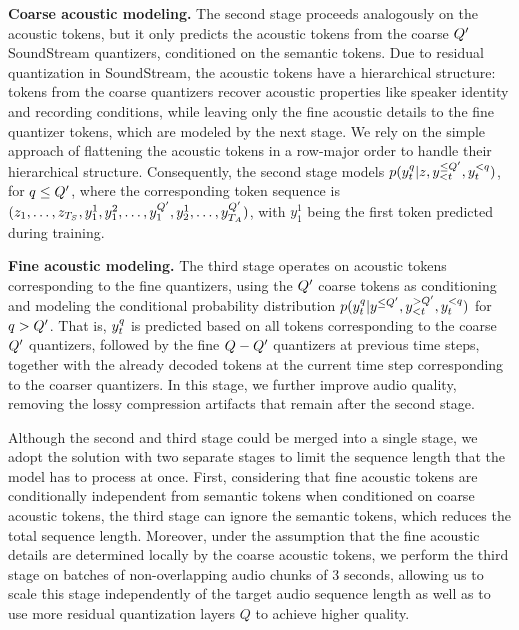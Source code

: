 \documentclass[letterpaper,10 pt]{IEEEtran}
\begin{document}
\noindent
\textbf{Coarse acoustic modeling.} The second stage proceeds analogously on the acoustic tokens, but it only predicts the acoustic tokens from the coarse $Q'$ SoundStream quantizers, conditioned on the semantic tokens. Due to residual quantization in SoundStream, the acoustic tokens have a hierarchical structure: tokens from the coarse quantizers recover acoustic properties like speaker identity and recording conditions, while leaving only the fine acoustic details to the fine quantizer tokens, which are modeled by the next stage. We rely on the simple approach of flattening the acoustic tokens in a row-major order to handle their hierarchical structure. Consequently, the second stage models $p(y_t^q | z, y_{<t}^{\leq Q'}, y_{t}^{< q})$, for $q \leq Q'$, where the corresponding token sequence is $(z_1, \dots, z_{T_S}, y_1^1,y_1^2,\dots,y_1^{Q'}, y_2^1,\dots,y_{T_A}^{Q'})$, with $y_1^1$ being the first token predicted during training.

\noindent
\textbf{Fine acoustic modeling.} The third stage operates on acoustic tokens corresponding to the fine quantizers, using the $Q'$ coarse tokens as conditioning and modeling the conditional probability distribution  $p(y_t^q | y^{\leq Q'}, y_{<t}^{> Q'}, y_{t}^{<q})$ for $q > Q'$. That is, $y_t^q$ is predicted based on all tokens corresponding to the coarse $Q'$ quantizers, followed by the fine $Q-Q'$ quantizers at previous time steps, together with the already decoded tokens at the current time step corresponding to the coarser quantizers. In this stage, we further improve audio quality, removing the lossy compression artifacts that remain after the second stage. 

Although the second and third stage could be merged into a single stage, we adopt the solution with two separate stages to limit the sequence length that the model has to process at once. First, considering that fine acoustic tokens are conditionally independent from semantic tokens when conditioned on coarse acoustic tokens, the third stage can ignore the semantic tokens, which reduces the total sequence length. Moreover, under the assumption that the fine acoustic details are determined locally by the coarse acoustic tokens, we perform the third stage on batches of non-overlapping audio chunks of 3 seconds, allowing us to scale this stage independently of the target audio sequence length as well as to use more residual quantization layers $Q$ to achieve higher quality.
\end{document}
